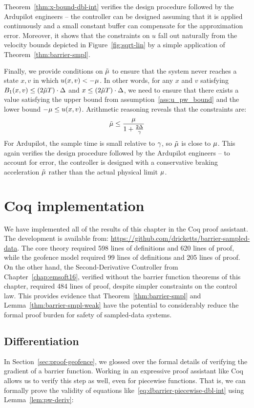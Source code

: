 Theorem~\ref{thm:x-bound-dbl-int} verifies the design procedure followed by
the Ardupilot engineers -- the controller can be designed assuming that it
is applied continuously and a small constant buffer can compensate for the
approximation error. Moreover, it shows that the constraints on $u$ fall
out naturally from the velocity bounds depicted in
Figure~\ref{fig:sqrt-lin} by a simple application of
Theorem~\ref{thm:barrier-smpl}.

Finally, we provide conditions on $\tilde{\mu}$ to ensure that the system never
reaches a state $x,v$ in which $u(x,v) < -\mu$. In other words, for any
$x$ and $v$ satisfying $B_1 (x,v) \leq (2\tilde{\mu} T) \cdot \Delta$ and $x \leq
(2\tilde{\mu} T) \cdot \Delta$, we need to ensure that there exists a value
satisfying the upper bound from assumption~\ref{ass:u_pw_bound} and the
lower bound $-\mu \leq u(x,v)$. Arithmetic reasoning reveals that the
constraints are:
\begin{equation}
\tilde{\mu} \leq \frac{\mu}{1 + \frac{2\Delta}{\gamma}}
\end{equation}
For Ardupilot, the sample time is small relative to $\gamma$, so $\tilde{\mu}$ is
close to $\mu$. This again verifies the design procedure followed by the
Ardupilot engineers -- to account for error, the controller is designed
with a conservative braking acceleration $\tilde{\mu}$ rather than the actual
physical limit $\mu$.

\section{Coq implementation}
\label{sec:coq}
We have implemented all of the results of this chapter in the Coq proof
assistant. The development is available from:
\url{https://github.com/dricketts/barrier-sampled-data}. The core theory
required 598 lines of definitions and 620 lines of proof, while the
geofence model required 99 lines of definitions and 205 lines of proof. On
the other hand, the Second-Derivative Controller from
Chapter~\ref{chap:emsoft16}, verified without the barrier function theorems
of this chapter, required 484 lines of proof, despite simpler constraints
on the control law. This provides evidence that
Theorem~\ref{thm:barrier-smpl} and Lemma~\ref{thm:barrier-smpl-weak} have
the potential to considerably reduce the formal proof burden for safety of
sampled-data systems.

\subsection{Differentiation}
\label{sec:differentiation}
In Section~\ref{sec:proof-geofence}, we glossed over the formal details of
verifying the gradient of a barrier function. Working in an expressive
proof assistant like Coq allows us to verify this step as well, even for
piecewise functions. That is, we can formally prove the validity of
equations like~\eqref{eq:dbarrier-piecewise-dbl-int} using
Lemma~\ref{lem:pw-deriv}:

